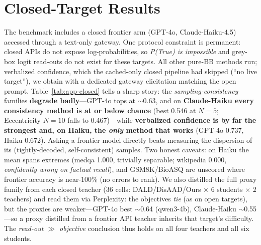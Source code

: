 \documentclass[11pt]{article}
\begin{document}
\section{Closed-Target Results}\label{app:closed}
The benchmark includes a closed frontier arm (GPT-4o, Claude-Haiku-4.5) accessed through a
text-only gateway. One protocol constraint is permanent: closed APIs do not expose
log-probabilities, so \emph{P(True) is impossible} and grey-box logit read-outs do not
exist for these targets. All other pure-BB methods run; verbalized confidence, which the
cached-only closed pipeline had skipped (``no live target''), we obtain with a dedicated
gateway elicitation matching the open prompt. Table~\ref{tab:app-closed} tells a sharp
story: the \emph{sampling-consistency} families \textbf{degrade badly}---GPT-4o tops at
$\sim$0.63, and on \textbf{Claude-Haiku every consistency method is at or below chance}
(best 0.546 at $N{=}5$; Eccentricity $N{=}10$ falls to 0.467)---while \textbf{verbalized
confidence is by far the strongest and, on Haiku, the \emph{only} method that works}
(GPT-4o 0.737, Haiku 0.672). Asking a frontier model directly beats measuring the
dispersion of its (tightly-decoded, self-consistent) samples. Two honest caveats: on
Haiku the mean spans extremes (medqa 1.000, trivially separable; wikipedia 0.000,
\emph{confidently wrong on factual recall}), and GSM8K/BioASQ are unscored where frontier
accuracy is near-100\% (no errors to rank). We also distilled the full proxy family from
each closed teacher (36 cells: DALD/DisAAD/Ours $\times$ 6 students $\times$ 2 teachers) and
read them via Perplexity: the objectives \emph{tie} (as on open targets), but the proxies
are weaker---GPT-4o best $\sim$0.64 (qwen3-4b), Claude-Haiku $\sim$0.55---so a proxy
distilled from a frontier API teacher inherits that target's difficulty. The
\emph{read-out $\gg$ objective} conclusion thus holds on all four teachers and all six
students.
\end{document}
